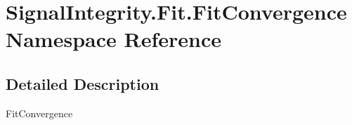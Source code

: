 \hypertarget{namespaceSignalIntegrity_1_1Fit_1_1FitConvergence}{}\section{Signal\+Integrity.\+Fit.\+Fit\+Convergence Namespace Reference}
\label{namespaceSignalIntegrity_1_1Fit_1_1FitConvergence}


\subsection{Detailed Description}
\begin{DoxyVerb}FitConvergence\end{DoxyVerb}
 